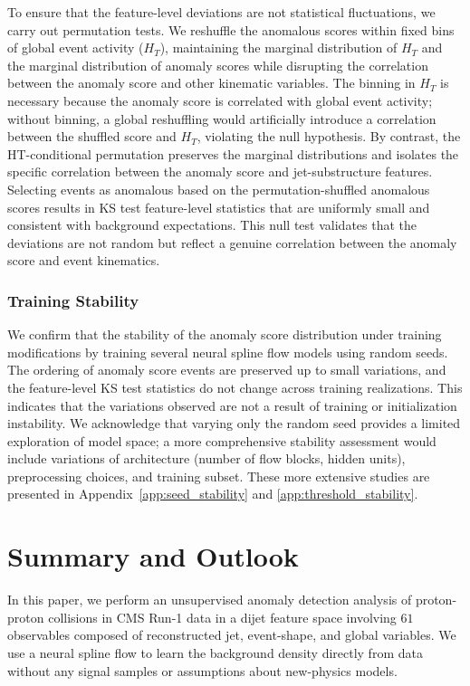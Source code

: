 \documentclass[11pt,a4paper,twocolumn]{article}
\begin{document}
To ensure that the feature-level deviations are not statistical fluctuations, we carry out permutation tests. We reshuffle the anomalous scores within fixed bins of global event activity ($H_T$), maintaining the marginal distribution of $H_T$ and the marginal distribution of anomaly scores while disrupting the correlation between the anomaly score and other kinematic variables. The binning in $H_T$ is necessary because the anomaly score is correlated with global event activity; without binning, a global reshuffling would artificially introduce a correlation between the shuffled score and $H_T$, violating the null hypothesis. By contrast, the HT-conditional permutation preserves the marginal distributions and isolates the specific correlation between the anomaly score and jet-substructure features. Selecting events as anomalous based on the permutation-shuffled anomalous scores results in KS test feature-level statistics that are uniformly small and consistent with background expectations. This null test validates that the deviations are not random but reflect a genuine correlation between the anomaly score and event kinematics.

\subsubsection{Training Stability}

We confirm that the stability of the anomaly score distribution under training modifications by training several neural spline flow models using random seeds. The ordering of anomaly score events are preserved up to small variations, and the feature-level KS test statistics do not change across training realizations. This indicates that the variations observed are not a result of training or initialization instability. We acknowledge that varying only the random seed provides a limited exploration of model space; a more comprehensive stability assessment would include variations of architecture (number of flow blocks, hidden units), preprocessing choices, and training subset. These more extensive studies are presented in Appendix~\ref{app:seed_stability} and \ref{app:threshold_stability}.

\section{Summary and Outlook}
\label{sec:summary}

In this paper, we perform an unsupervised anomaly detection analysis of proton-proton collisions in CMS Run-1 data in a dijet feature space involving $61$ observables composed of reconstructed jet, event-shape, and global variables. We use a neural spline flow to learn the background density directly from data without any signal samples or assumptions about new-physics models.
\end{document}
